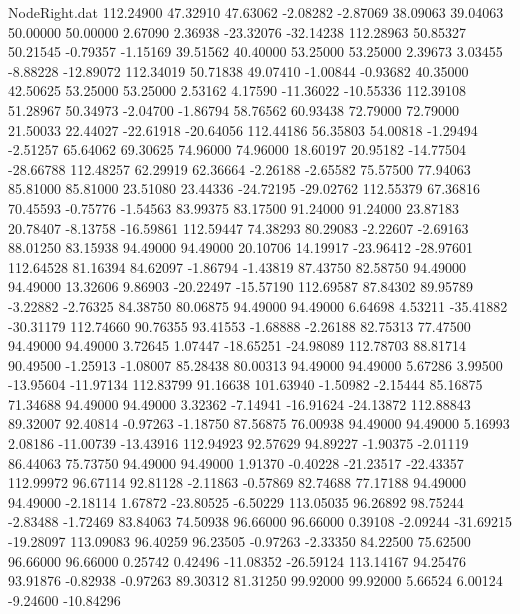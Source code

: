 \begin{filecontents}{NodeRight.dat}
 112.24900   47.32910   47.63062    -2.08282   -2.87069   38.09063   39.04063   50.00000   50.00000    2.67090    2.36938  -23.32076  -32.14238
 112.28963   50.85327   50.21545    -0.79357   -1.15169   39.51562   40.40000   53.25000   53.25000    2.39673    3.03455   -8.88228  -12.89072
 112.34019   50.71838   49.07410    -1.00844   -0.93682   40.35000   42.50625   53.25000   53.25000    2.53162    4.17590  -11.36022  -10.55336
 112.39108   51.28967   50.34973    -2.04700   -1.86794   58.76562   60.93438   72.79000   72.79000   21.50033   22.44027  -22.61918  -20.64056
 112.44186   56.35803   54.00818    -1.29494   -2.51257   65.64062   69.30625   74.96000   74.96000   18.60197   20.95182  -14.77504  -28.66788
 112.48257   62.29919   62.36664    -2.26188   -2.65582   75.57500   77.94063   85.81000   85.81000   23.51080   23.44336  -24.72195  -29.02762
 112.55379   67.36816   70.45593    -0.75776   -1.54563   83.99375   83.17500   91.24000   91.24000   23.87183   20.78407   -8.13758  -16.59861
 112.59447   74.38293   80.29083    -2.22607   -2.69163   88.01250   83.15938   94.49000   94.49000   20.10706   14.19917  -23.96412  -28.97601
 112.64528   81.16394   84.62097    -1.86794   -1.43819   87.43750   82.58750   94.49000   94.49000   13.32606    9.86903  -20.22497  -15.57190
 112.69587   87.84302   89.95789    -3.22882   -2.76325   84.38750   80.06875   94.49000   94.49000    6.64698    4.53211  -35.41882  -30.31179
 112.74660   90.76355   93.41553    -1.68888   -2.26188   82.75313   77.47500   94.49000   94.49000    3.72645    1.07447  -18.65251  -24.98089
 112.78703   88.81714   90.49500    -1.25913   -1.08007   85.28438   80.00313   94.49000   94.49000    5.67286    3.99500  -13.95604  -11.97134
 112.83799   91.16638  101.63940    -1.50982   -2.15444   85.16875   71.34688   94.49000   94.49000    3.32362   -7.14941  -16.91624  -24.13872
 112.88843   89.32007   92.40814    -0.97263   -1.18750   87.56875   76.00938   94.49000   94.49000    5.16993    2.08186  -11.00739  -13.43916
 112.94923   92.57629   94.89227    -1.90375   -2.01119   86.44063   75.73750   94.49000   94.49000    1.91370   -0.40228  -21.23517  -22.43357
 112.99972   96.67114   92.81128    -2.11863   -0.57869   82.74688   77.17188   94.49000   94.49000   -2.18114    1.67872  -23.80525   -6.50229
 113.05035   96.26892   98.75244    -2.83488   -1.72469   83.84063   74.50938   96.66000   96.66000    0.39108   -2.09244  -31.69215  -19.28097
 113.09083   96.40259   96.23505    -0.97263   -2.33350   84.22500   75.62500   96.66000   96.66000    0.25742    0.42496  -11.08352  -26.59124
 113.14167   94.25476   93.91876    -0.82938   -0.97263   89.30312   81.31250   99.92000   99.92000    5.66524    6.00124   -9.24600  -10.84296

\end{filecontents}
